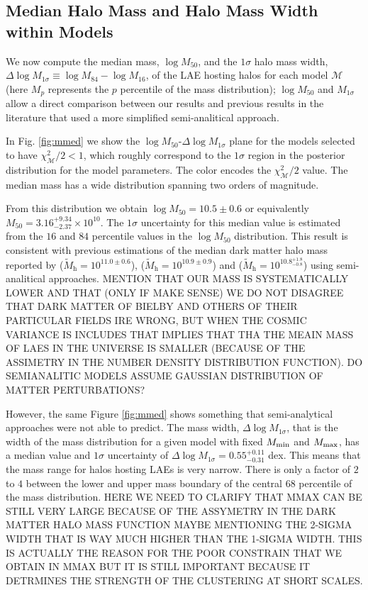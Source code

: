 \documentclass{emulateapj}
\newcommand{\hMsun}{{\ifmmode{h^{-1}{\rm {M_{\odot}}}}\else{$h^{-1}{\rm{M_{\odot}}}$}\fi}}
\newcommand{\mmin}{{\ifmmode{{M_{\rm min}}}\else{${M_{\rm min}}$}\fi}}
\newcommand{\mmax}{{\ifmmode{{M_{\rm max}}}\else{${M_{\rm max}}$}\fi}}
\newcommand{\todo}{\ifmmode \text{\Huge{\(\bullet\)}} \else {\Huge$\bullet$}\fi}
\begin{document}
\subsection{Median Halo Mass and Halo Mass Width within Models}

We now compute the median mass, $\log M_{50}$, and the $1\sigma$ halo mass
width, $\Delta \log M_{1\sigma} \equiv \log M_{84} - \log M_{16}$, of the
LAE hosting halos for each model  $\mathcal{M}$ (here $M_{p}$
represents the $p$ percentile of the mass distribution); $\log M_{50}$
and $M_{1\sigma}$ allow a direct comparison between our results and
previous results in the literature
\citep[e.g.][]{Hayashino2004,Gawiser2007,Ouchi2010,Bielby16} that used
a more simplified semi-analitical approach. 

In Fig. \ref{fig:mmed} we show the $\log M_{50}$-$\Delta \log M_{1\sigma}$
plane for the models selected to have $\chi^{2}_{\mathcal{M}}/2 < 1$,
which roughly correspond to the $1\sigma$ region in the posterior
distribution for the model parameters. The color encodes the
$\chi^{2}_{\mathcal{M}}/2$ value. The median mass has a wide distribution
spanning two orders of magnitude.

From this distribution we obtain $\log M_{50} = 10.5\pm 0.6$ or
equivalently $M_{50} = 3.16^{+9.34}_{-2.37}\times 10^{10}$\hMsun.  
The $1\sigma$ uncertainty for this median value is estimated from the
$16$ and $84$ percentile values in the $\log M_{50}$ distribution.  
This result is consistent with previous
 estimations of  the  median dark matter halo mass reported by
 \citet{Bielby16} ($\tilde{M}_{\mathrm h} = 10^{11.0\pm0.6}$),
 \citet{Gawiser07} ($\tilde{M}_{\mathrm h} = 10^{10.9\pm0.9}$) and
 \citet{Ouchi2010} ($\tilde{M}_{\mathrm h} = 10^{10.8^{+1.8}_{-0.8}}$) 
using semi-analitical approaches.   MENTION THAT OUR MASS IS SYSTEMATICALLY LOWER
AND THAT (ONLY IF MAKE SENSE) WE DO NOT DISAGREE  THAT DARK MATTER OF BIELBY AND OTHERS  OF THEIR PARTICULAR FIELDS IRE WRONG, BUT WHEN THE COSMIC VARIANCE IS INCLUDES THAT IMPLIES THAT THA THE MEAIN MASS OF LAES IN THE UNIVERSE IS SMALLER (BECAUSE OF THE ASSIMETRY IN THE NUMBER DENSITY DISTRIBUTION FUNCTION). DO SEMIANALITIC MODELS ASSUME GAUSSIAN DISTRIBUTION OF MATTER PERTURBATIONS?


However, the same Figure \ref{fig:mmed} shows something 
that semi-analytical approaches were not able to predict.
The mass width, $\Delta \log M_{1\sigma}$, that is the width of the mass
distribution for a given model with fixed $\mmin$ and $\mmax$, has a
median value and $1\sigma$ uncertainty of $\Delta \log M_{1\sigma} =
0.55^{+0.11}_{-0.31}$ dex.
This means that the mass range for halos hosting LAEs is very narrow.
There is only a factor of $2$ to $4$ between the lower and upper mass
boundary of the central 68 percentile of the mass distribution. 
\todo HERE WE NEED TO CLARIFY THAT MMAX CAN BE STILL VERY 
LARGE BECAUSE OF THE ASSYMETRY IN THE DARK MATTER HALO MASS 
FUNCTION MAYBE MENTIONING THE 2-SIGMA WIDTH THAT IS WAY MUCH 
HIGHER THAN THE 1-SIGMA WIDTH. THIS IS ACTUALLY THE REASON FOR 
THE POOR CONSTRAIN THAT WE OBTAIN IN MMAX BUT IT IS STILL IMPORTANT
BECAUSE IT DETRMINES THE  STRENGTH OF THE CLUSTERING AT SHORT SCALES.
\end{document}
